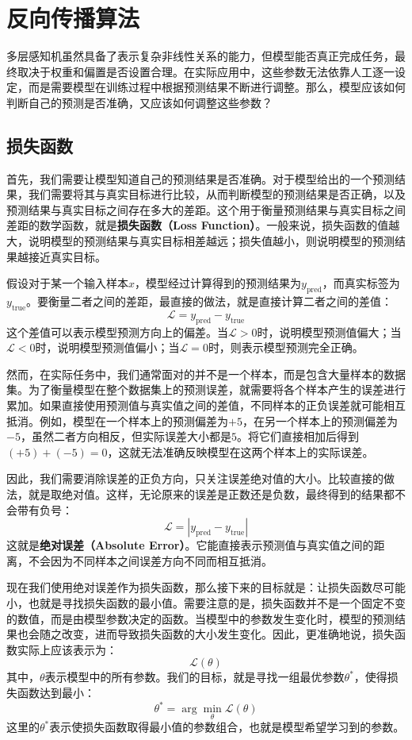 
\chapter{反向传播算法}

多层感知机虽然具备了表示复杂非线性关系的能力，但模型能否真正完成任务，最终取决于权重和偏置是否设置合理。在实际应用中，这些参数无法依靠人工逐一设定，而是需要模型在训练过程中根据预测结果不断进行调整。那么，模型应该如何判断自己的预测是否准确，又应该如何调整这些参数？

\section{损失函数}

首先，我们需要让模型知道自己的预测结果是否准确。对于模型给出的一个预测结果，我们需要将其与真实目标进行比较，从而判断模型的预测结果是否正确，以及预测结果与真实目标之间存在多大的差距。这个用于衡量预测结果与真实目标之间差距的数学函数，就是\textbf{损失函数（Loss Function）}。一般来说，损失函数的值越大，说明模型的预测结果与真实目标相差越远；损失值越小，则说明模型的预测结果越接近真实目标。

假设对于某一个输入样本$x$，模型经过计算得到的预测结果为$y_{\text{pred}}$，而真实标签为$y_{\text{true}}$。要衡量二者之间的差距，最直接的做法，就是直接计算二者之间的差值：
$$
\mathcal{L} = y_{\text{pred}} - y_{\text{true}}
$$
这个差值可以表示模型预测方向上的偏差。当$\mathcal{L}>0$时，说明模型预测值偏大；当$\mathcal{L}<0$时，说明模型预测值偏小；当$\mathcal{L}=0$时，则表示模型预测完全正确。

然而，在实际任务中，我们通常面对的并不是一个样本，而是包含大量样本的数据集。为了衡量模型在整个数据集上的预测误差，就需要将各个样本产生的误差进行累加。如果直接使用预测值与真实值之间的差值，不同样本的正负误差就可能相互抵消。例如，模型在一个样本上的预测偏差为$+5$，在另一个样本上的预测偏差为$-5$，虽然二者方向相反，但实际误差大小都是$5$。将它们直接相加后得到$(+5)+(-5)=0$，这就无法准确反映模型在这两个样本上的实际误差。

因此，我们需要消除误差的正负方向，只关注误差绝对值的大小。比较直接的做法，就是取绝对值。这样，无论原来的误差是正数还是负数，最终得到的结果都不会带有负号：
$$
\mathcal{L}=|y_{\text{pred}}-y_{\text{true}}|
$$
这就是\textbf{绝对误差（Absolute Error）}。它能直接表示预测值与真实值之间的距离，不会因为不同样本之间误差方向不同而相互抵消。

现在我们使用绝对误差作为损失函数，那么接下来的目标就是：让损失函数尽可能小，也就是寻找损失函数的最小值。需要注意的是，损失函数并不是一个固定不变的数值，而是由模型参数决定的函数。当模型中的参数发生变化时，模型的预测结果也会随之改变，进而导致损失函数的大小发生变化。因此，更准确地说，损失函数实际上应该表示为：
$$
\mathcal{L}(\theta)
$$
其中，$\theta$表示模型中的所有参数。我们的目标，就是寻找一组最优参数$\theta^*$，使得损失函数达到最小：
$$
\theta^*=\arg\min_{\theta}\mathcal{L}(\theta)
$$
这里的$\theta^*$表示使损失函数取得最小值的参数组合，也就是模型希望学习到的参数。

